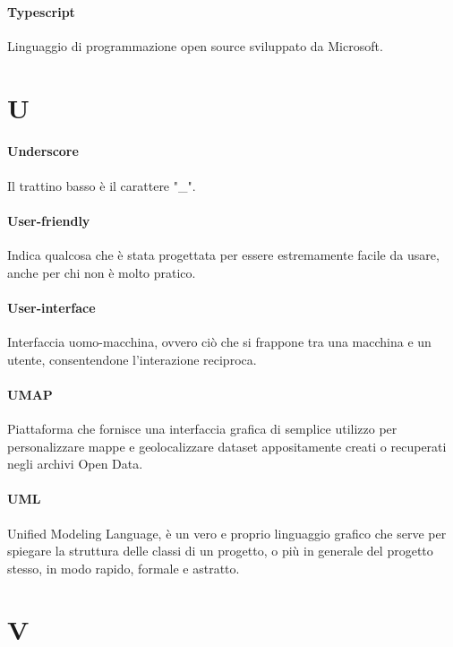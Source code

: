 \documentclass[]{article}
\begin{document}
	\paragraph*{Typescript}
	Linguaggio di programmazione open source sviluppato da Microsoft.
	
	\newpage
	
	\section*{U}
	
	\paragraph*{Underscore}
	Il trattino basso è il carattere "\_".
	
	\paragraph*{User-friendly}
	Indica qualcosa che è stata progettata per essere estremamente facile da usare, anche per chi non è molto pratico.
	
	\paragraph*{User-interface}
	Interfaccia uomo-macchina, ovvero ciò che si frappone tra una macchina e un utente, consentendone l'interazione reciproca.
	
	\paragraph*{UMAP}
	Piattaforma che fornisce una interfaccia grafica di semplice utilizzo per personalizzare mappe e geolocalizzare dataset appositamente creati o recuperati negli archivi Open Data.
	
	\paragraph*{UML}
	Unified Modeling Language, è un vero e proprio linguaggio grafico che serve per spiegare la struttura delle classi di un progetto, o più in generale del progetto stesso, in modo rapido, formale e astratto.
		
	\newpage
	
	\section*{V}
	
\end{document}
